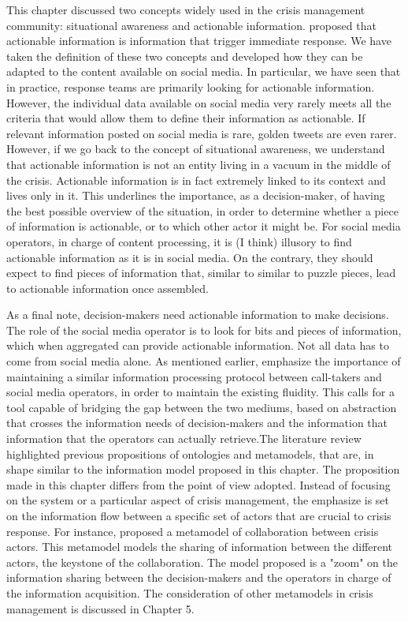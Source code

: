This chapter discussed two concepts widely used in the crisis management community: situational awareness and actionable information.
\textcite{zadeSituationalAwarenessActionability2018} proposed that actionable information is information that trigger immediate response.
We have taken the definition of these two concepts and developed how they can be adapted to the content available on social media.
In particular, we have seen that in practice, response teams are primarily looking for actionable information.
However, the individual data available on social media very rarely meets all the criteria that would allow them to define their information as actionable.
If relevant information posted on social media is rare, golden tweets are even rarer.
However, if we go back to the concept of situational awareness, we understand that actionable information is not an entity living in a vacuum in the middle of the crisis.
Actionable information is in fact extremely linked to its context and lives only in it.
This underlines the importance, as a decision-maker, of having the best possible overview of the situation, in order to determine
whether a piece of information is actionable, or to which other actor it might be.
For social media operators, in charge of content processing, it is (I think) illusory to find actionable information as it is in social media.
On the contrary, they should expect to find pieces of information that, similar to
similar to puzzle pieces, lead to actionable information once assembled.

As a final note, decision-makers need actionable information to make decisions.
The role of the social media operator is to look for bits and pieces of information, which when aggregated can provide actionable information.
Not all data has to come from social media alone.
As mentioned earlier, \textcite{graceRolePlayingNext2019} emphasize the importance of
maintaining a similar information processing protocol between call-takers and social media
operators, in order to maintain the existing fluidity.
This calls for a tool capable of bridging the gap between the two mediums, based on
abstraction that crosses the information needs of decision-makers and the information that
information that the operators can actually retrieve.The literature review highlighted previous
propositions of ontologies and metamodels, that are, in shape similar to the information model proposed in this chapter.
The proposition made in this chapter differs from the point of view adopted.
Instead of focusing on the system or a particular aspect of crisis management,
the emphasize is set on the information flow between a specific set of actors that are crucial to crisis response.
For instance, \textcite{benabenMetamodelKnowledgeManagement2016} proposed a metamodel of collaboration between crisis actors.
This metamodel models the sharing of information between the different actors, the keystone of the collaboration.
The model proposed is a "zoom" on the information sharing between the decision-makers and the operators in charge of the information acquisition.
The consideration of other metamodels in crisis management is discussed in Chapter 5.

